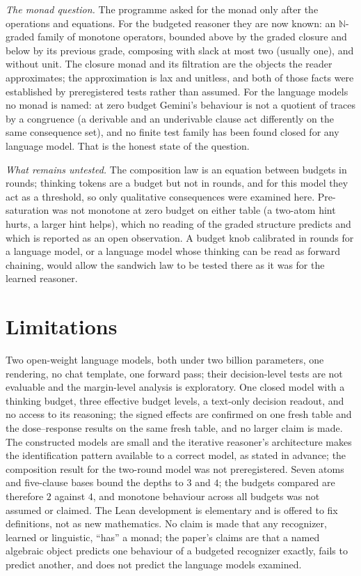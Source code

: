 \emph{The monad question.} The programme asked for the monad only after the operations and equations. For the budgeted reasoner they are now known: an \(\mathbb N\)-graded family of monotone operators, bounded above by the graded closure and below by its previous grade, composing with slack at most two (usually one), and without unit. The closure monad and its filtration are the objects the reader approximates; the approximation is lax and unitless, and both of those facts were established by preregistered tests rather than assumed. For the language models no monad is named: at zero budget Gemini's behaviour is not a quotient of traces by a congruence (a derivable and an underivable clause act differently on the same consequence set), and no finite test family has been found closed for any language model. That is the honest state of the question.

\emph{What remains untested.} The composition law is an equation between budgets in rounds; thinking tokens are a budget but not in rounds, and for this model they act as a threshold, so only qualitative consequences were examined here. Pre-saturation was not monotone at zero budget on either table (a two-atom hint hurts, a larger hint helps), which no reading of the graded structure predicts and which is reported as an open observation. A budget knob calibrated in rounds for a language model, or a language model whose thinking can be read as forward chaining, would allow the sandwich law to be tested there as it was for the learned reasoner.

\section{Limitations}\label{limitations}

Two open-weight language models, both under two billion parameters, one rendering, no chat template, one forward pass; their decision-level tests are not evaluable and the margin-level analysis is exploratory. One closed model with a thinking budget, three effective budget levels, a text-only decision readout, and no access to its reasoning; the signed effects are confirmed on one fresh table and the dose--response results on the same fresh table, and no larger claim is made. The constructed models are small and the iterative reasoner's architecture makes the identification pattern available to a correct model, as stated in advance; the composition result for the two-round model was not preregistered. Seven atoms and five-clause bases bound the depths to \(3\) and \(4\); the budgets compared are therefore \(2\) against \(4\), and monotone behaviour across all budgets was not assumed or claimed. The Lean development is elementary and is offered to fix definitions, not as new mathematics. No claim is made that any recognizer, learned or linguistic, ``has'' a monad; the paper's claims are that a named algebraic object predicts one behaviour of a budgeted recognizer exactly, fails to predict another, and does not predict the language models examined.

